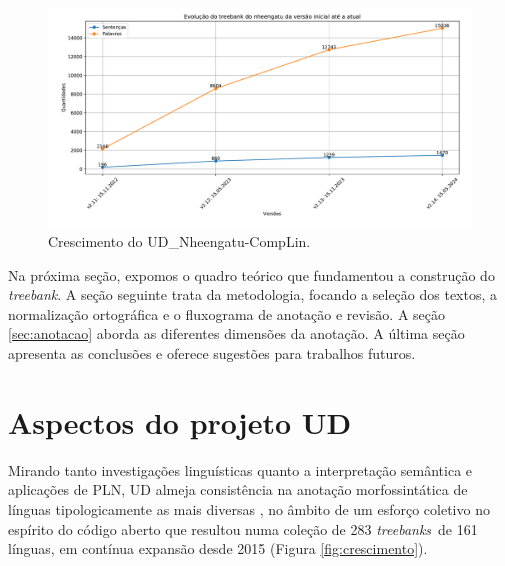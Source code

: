 \documentclass[portuguese]{textolivre}
\newcommand{\tbc}{UD\_Nheengatu-CompLin}
\newcommand{\tbs}{\textit{treebanks}}
\newcommand{\tb}{\textit{treebank}}
\begin{document}
\begin{figure}[htbp]
  \centering
  \begin{minipage}{.9\textwidth}
    \includegraphics[width=\linewidth]{figures/NheengatuTBEvolution.pdf}
    \caption{Crescimento do \tbc.}
    \label{fig:evolucao-muiratiwa}
  \end{minipage}
\end{figure}

Na próxima seção, expomos o quadro teórico que fundamentou a construção do \tb. A seção seguinte trata da metodologia, focando a seleção dos textos, a normalização ortográfica e o fluxograma de anotação e revisão. A seção \ref{sec:anotacao} aborda as diferentes dimensões da anotação. A última seção apresenta as conclusões e oferece sugestões para trabalhos futuros.

\section{Aspectos do projeto UD}\label{sec:ud}

Mirando tanto investigações linguísticas quanto a interpretação semântica e aplicações de PLN, UD almeja consistência na anotação morfossintática de línguas tipologicamente as mais diversas \parencite{de-marneffe-etal-2021-universal-k}, no âmbito de um esforço coletivo no espírito do código aberto que resultou numa coleção de 283 \tbs~de 161 línguas, em contínua expansão desde 2015 (Figura \ref{fig:crescimento}).  
\end{document}
